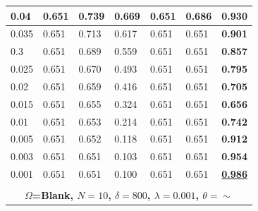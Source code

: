 \documentclass[letterpaper, 10 pt, conference]{ieeeconf}
\begin{document}
\begin{figure}[!h]
\begin{minipage}{\columnwidth}
{\begin{tabular}{|lllllll|}
\multicolumn{1}{|l|}{0.04} & \multicolumn{1}{l|}{0.651} & \multicolumn{1}{l|}{0.739} & \multicolumn{1}{l|}{0.669} & \multicolumn{1}{l|}{0.651} & \multicolumn{1}{l|}{0.686} & \textbf{0.930} \\ \hline
\multicolumn{1}{|l|}{0.035} & \multicolumn{1}{l|}{0.651} & \multicolumn{1}{l|}{0.713} & \multicolumn{1}{l|}{0.617} & \multicolumn{1}{l|}{0.651} & \multicolumn{1}{l|}{0.651} & \textbf{0.901} \\ \hline
\multicolumn{1}{|l|}{0.3} & \multicolumn{1}{l|}{0.651} & \multicolumn{1}{l|}{0.689} & \multicolumn{1}{l|}{0.559} & \multicolumn{1}{l|}{0.651} & \multicolumn{1}{l|}{0.651} & \textbf{0.857} \\ \hline
\multicolumn{1}{|l|}{0.025} & \multicolumn{1}{l|}{0.651} & \multicolumn{1}{l|}{0.670} & \multicolumn{1}{l|}{0.493} & \multicolumn{1}{l|}{0.651} & \multicolumn{1}{l|}{0.651} & \textbf{0.795} \\ \hline
\multicolumn{1}{|l|}{0.02} & \multicolumn{1}{l|}{0.651} & \multicolumn{1}{l|}{0.659} & \multicolumn{1}{l|}{0.416} & \multicolumn{1}{l|}{0.651} & \multicolumn{1}{l|}{0.651} & \textbf{0.705} \\ \hline
\multicolumn{1}{|l|}{0.015} & \multicolumn{1}{l|}{0.651} & \multicolumn{1}{l|}{0.655} & \multicolumn{1}{l|}{0.324} & \multicolumn{1}{l|}{0.651} & \multicolumn{1}{l|}{0.651} & \textbf{0.656} \\ \hline
\multicolumn{1}{|l|}{0.01} & \multicolumn{1}{l|}{0.651} & \multicolumn{1}{l|}{0.653} & \multicolumn{1}{l|}{0.214} & \multicolumn{1}{l|}{0.651} & \multicolumn{1}{l|}{0.651} & \textbf{0.742} \\ \hline
\multicolumn{1}{|l|}{0.005} & \multicolumn{1}{l|}{0.651} & \multicolumn{1}{l|}{0.652} & \multicolumn{1}{l|}{0.118} & \multicolumn{1}{l|}{0.651} & \multicolumn{1}{l|}{0.651} & \textbf{0.912} \\ \hline
\multicolumn{1}{|l|}{0.003} & \multicolumn{1}{l|}{0.651} & \multicolumn{1}{l|}{0.651} & \multicolumn{1}{l|}{0.103} & \multicolumn{1}{l|}{0.651} & \multicolumn{1}{l|}{0.651} & \textbf{0.954} \\ \hline
\multicolumn{1}{|l|}{0.001} & \multicolumn{1}{l|}{0.651} & \multicolumn{1}{l|}{0.651} & \multicolumn{1}{l|}{0.100} & \multicolumn{1}{l|}{0.651} & \multicolumn{1}{l|}{0.651} & {\ul \textbf{0.986}} \\ \hline
\multicolumn{7}{|l|}{\cellcolor[HTML]{C0C0C0}} \\ \hline
\multicolumn{7}{|c|}{\textbf{$\Omega$=Blank, $N=10$,   $\delta=800$, $\lambda=0.001$, $\theta=\sim$}} \\ \hline

\end{tabular}}
\end{minipage}
\end{figure}
\end{document}
